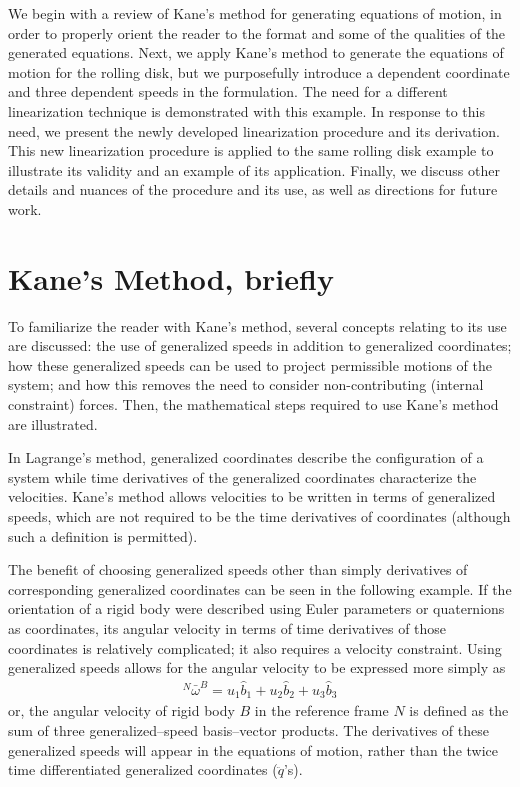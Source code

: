 \documentclass[smallcondensed,final]{svjour3}                     %
\begin{document}
We begin with a review of Kane's method for generating equations of motion, in
order to properly orient the reader to the format and some of the qualities of
the generated equations. Next, we apply Kane's method to generate the equations
of motion for the rolling disk, but we purposefully introduce a dependent
coordinate and three dependent speeds in the formulation.  The need for a
different linearization technique is demonstrated with this example. In
response to this need, we present the newly developed linearization procedure
and its derivation. This new linearization procedure is applied to the same
rolling disk example to illustrate its validity and an example of its
application. Finally, we discuss other details and nuances of the procedure and
its use, as well as directions for future work.

\section{Kane's Method, briefly}
\label{sec:kane_method}
To familiarize the reader with Kane's method, several concepts relating to its
use are discussed: the use of generalized speeds in addition to generalized
coordinates; how these generalized speeds can be used to project permissible
motions of the system; and how this removes the need to consider
non-contributing (internal constraint) forces.  Then, the mathematical steps
required to use Kane's method are illustrated.

In Lagrange's method, generalized coordinates describe the configuration of a
system while time derivatives of the generalized coordinates characterize the
velocities.  Kane's method allows velocities to be written in terms
of generalized speeds, which are not required to be the time derivatives of
coordinates (although such a definition is permitted).

The benefit of choosing generalized speeds other than simply derivatives of
corresponding generalized coordinates can be seen in the following example. If
the orientation of a rigid body were described using Euler parameters or
quaternions as coordinates, its angular velocity in terms of time derivatives
of those coordinates is relatively complicated; it also requires a velocity
constraint. Using generalized speeds allows for the angular velocity to be
expressed more simply as
\begin{align}
\label{eq:ex1}
{^N}\bar{\omega}^B = u_1 \hat{b}_1 + u_2 \hat{b}_2 + u_3 \hat{b}_3
\end{align}
or, the angular velocity of rigid body $B$ in the reference frame $N$ is
defined as the sum of three generalized--speed basis--vector products.
The derivatives of these generalized speeds will appear in the equations
of motion, rather than the twice time differentiated generalized coordinates
($\ddot{q}$'s).
\end{document}
